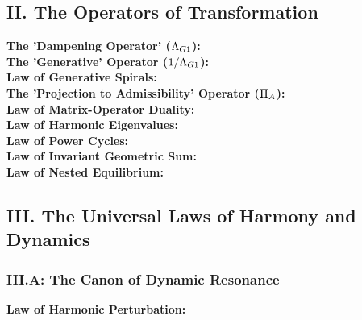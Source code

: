 \subsection*{II. The Operators of Transformation}
\begin{description}
    \item[\bfseries The 'Dampening Operator' ($\Lambda_{G1}$):] 
    \item[\bfseries The 'Generative' Operator ($1/\Lambda_{G1}$):] 
    \item[\bfseries Law of Generative Spirals:] 
    \item[\bfseries The 'Projection to Admissibility' Operator ($\Pi_{A}$):] 
    \item[\bfseries Law of Matrix-Operator Duality:]     
    \item[\bfseries Law of Harmonic Eigenvalues:] 
    \item[\bfseries Law of Power Cycles:] 
    \item[\bfseries Law of Invariant Geometric Sum:] 
    \item[\bfseries Law of Nested Equilibrium:] 
\end{description}

\vspace{1cm}
\subsection*{III. The Universal Laws of Harmony and Dynamics}

\subsubsection*{III.A: The Canon of Dynamic Resonance}
\begin{description}
    \item[\bfseries Law of Harmonic Perturbation:] 
\end{description}


